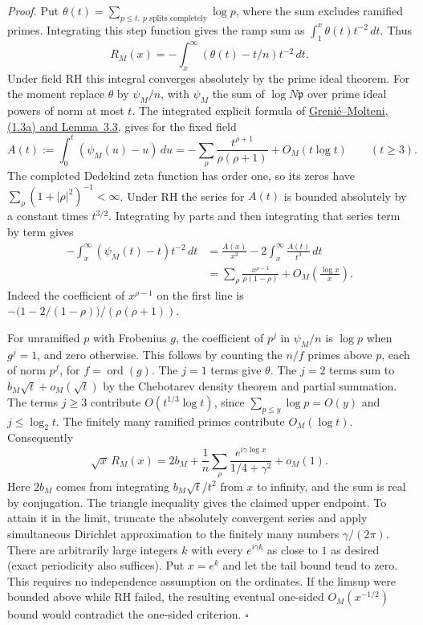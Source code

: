 \documentclass[11pt]{article}
\begin{document}
\smallskip\noindent\emph{Proof.}
Put $\theta(t)=\sum_{p\le t,\ p\text{ splits completely}}\log p$,
where the sum excludes ramified primes. Integrating this step function
gives the ramp sum as $\int_1^x\theta(t)t^{-2}\,dt$. Thus
\[
 R_M(x)=-\int_x^\infty (\theta(t)-t/n)t^{-2}\,dt .
\]
Under field RH this integral converges absolutely by the prime ideal theorem.
For the moment replace $\theta$ by $\psi_M/n$, with $\psi_M$ the sum of
$\log N\mathfrak p$ over prime ideal powers of norm at most $t$.
The integrated explicit formula of
\href{https://arxiv.org/pdf/1312.4465}{Greni\'e--Molteni, (1.3a) and Lemma~3.3},
gives for the fixed field
\[
 A(t):=\int_0^t (\psi_M(u)-u)\,du
    =-\sum_\rho\frac{t^{\rho+1}}{\rho(\rho+1)}+O_M(t\log t)
 \qquad (t\ge 3).
\]
The completed Dedekind zeta function has order one, so its zeros have
$\sum_\rho(1+|\rho|^2)^{-1}<\infty$. Under RH the series for $A(t)$
is bounded absolutely by a constant times $t^{3/2}$. Integrating by parts
and then integrating that series term by term gives
\[
\begin{aligned}
 -\int_x^\infty (\psi_M(t)-t)t^{-2}\,dt
 &=\frac{A(x)}{x^2}-2\int_x^\infty\frac{A(t)}{t^3}\,dt\\
 &=\sum_\rho\frac{x^{\rho-1}}{\rho(1-\rho)}
     +O_M\!\left(\frac{\log x}{x}\right).
\end{aligned}
\]
Indeed the coefficient of $x^{\rho-1}$ on the first line is
$-\bigl(1-2/(1-\rho)\bigr)/(\rho(\rho+1))$.

For unramified $p$ with Frobenius $g$, the coefficient of $p^j$ in
$\psi_M/n$ is $\log p$ when $g^j=1$, and zero otherwise. This follows
by counting the $n/f$ primes above $p$, each of norm $p^f$, for
$f=\operatorname{ord}(g)$. The $j=1$ terms give $\theta$. The $j=2$
terms sum to $b_M\sqrt{t}+o_M(\sqrt{t})$ by the Chebotarev density theorem
and partial summation. The terms $j\ge3$ contribute
$O(t^{1/3}\log t)$, since $\sum_{p\le y}\log p=O(y)$ and
$j\le\log_2 t$. The finitely many ramified primes contribute $O_M(\log t)$.
Consequently
\[
 \sqrt{x}\,R_M(x)=
  2b_M+\frac1n\sum_\rho\frac{e^{i\gamma\log x}}{1/4+\gamma^2}+o_M(1).
\]
Here $2b_M$ comes from integrating $b_M\sqrt t/t^2$ from $x$ to
infinity, and the sum is real by conjugation. The triangle inequality
gives the claimed upper endpoint. To attain it in the limit, truncate the
absolutely convergent series and apply simultaneous Dirichlet approximation
to the finitely many numbers $\gamma/(2\pi)$. There are arbitrarily large
integers $k$ with every $e^{i\gamma k}$ as close to $1$ as desired
(exact periodicity also suffices). Put $x=e^k$ and let the tail bound
tend to zero. This requires no independence assumption on the ordinates.
If the limsup were bounded above while RH failed, the resulting eventual
one-sided $O_M(x^{-1/2})$ bound would contradict the one-sided criterion.
\hfill$\square$
\end{document}
